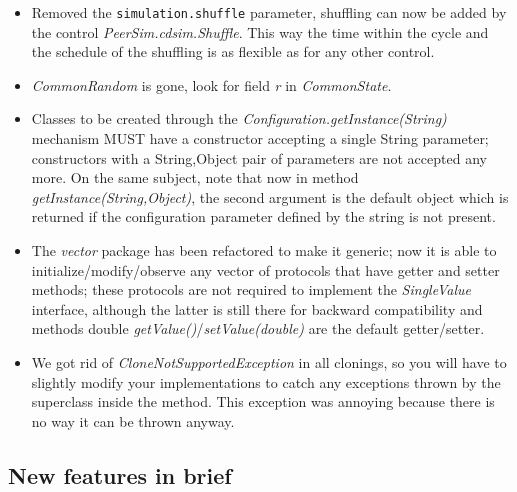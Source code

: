\documentclass[a4paper,11pt]{article}
\begin{document}
\begin{itemize}
\item Removed the \texttt{simulation.shuffle} parameter, shuffling can now be
  added by the control \emph{PeerSim.cdsim.Shuffle}. This way the time
  within the cycle and 
  the schedule of the shuffling is as flexible as for any other control.

\item \emph{CommonRandom} is gone, look for field \emph{r} in
  \emph{CommonState}.

\item Classes to be created through the
  \emph{Configuration.getInstance(String)}  
  mechanism MUST have a constructor accepting a single String
  parameter; constructors 
  with a String,Object pair of parameters are not accepted any more.
  On the same subject, note that now in method
  \emph{getInstance(String,Object)}, 
  the second argument is the default object which is returned if the
  configuration parameter defined by the string is not present.

\item The \emph{vector} package has been refactored to make it
  generic; now it is able 
  to initialize/modify/observe any vector of protocols that have getter and
  setter methods; these protocols are not required to implement the 
  \emph{SingleValue} interface, although the latter is still there for
  backward  
  compatibility and methods double
  \emph{getValue()}/\emph{setValue(double)} are the  
  default getter/setter.

\item We got rid of \emph{CloneNotSupportedException} in all clonings,
  so you will have 
  to slightly modify your implementations to catch any exceptions thrown by 
  the superclass inside the method. This exception was annoying because 
  there is no way it can be thrown anyway.
\end{itemize} 


\subsection{New features in brief}
\label{s:new_features}
\end{document}
